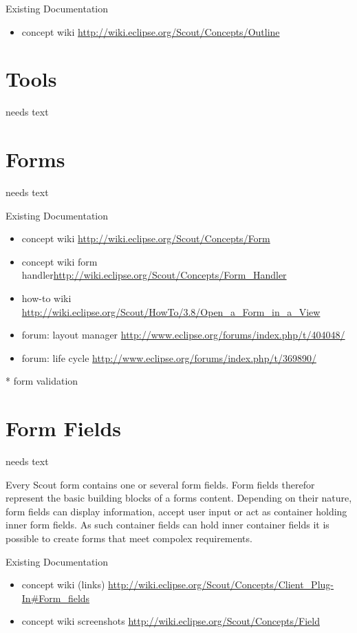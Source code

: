 \documentclass[a4paper,10pt,twoside]{book}
\begin{document}
{\noindent Existing Documentation
\begin{itemize}
  \item concept wiki \url{http://wiki.eclipse.org/Scout/Concepts/Outline}
\end{itemize}

\section{Tools}
needs text

	
\section{Forms}
needs text

\noindent Existing Documentation
\begin{itemize}
  \item concept wiki \url{http://wiki.eclipse.org/Scout/Concepts/Form}
  \item concept wiki form handler\url{http://wiki.eclipse.org/Scout/Concepts/Form_Handler}
  \item how-to wiki \url{http://wiki.eclipse.org/Scout/HowTo/3.8/Open_a_Form_in_a_View}
  \item forum: layout manager \url{http://www.eclipse.org/forums/index.php/t/404048/}
  \item forum: life cycle \url{http://www.eclipse.org/forums/index.php/t/369890/}
\end{itemize}

	* form validation

\section{Form Fields}
needs text

Every Scout form contains one or several form fields.
Form fields therefor represent the basic building blocks of a forms content. 
Depending on their nature, form fields can display information, accept user input or act as container holding inner form fields.
As such container fields can hold inner container fields it is possible to create forms that meet compolex requirements.

\noindent Existing Documentation
\begin{itemize}
  \item concept wiki (links) \url{http://wiki.eclipse.org/Scout/Concepts/Client_Plug-In#Form_fields}
  \item concept wiki screenshots \url{http://wiki.eclipse.org/Scout/Concepts/Field}
\end{itemize}

}
\end{document}
